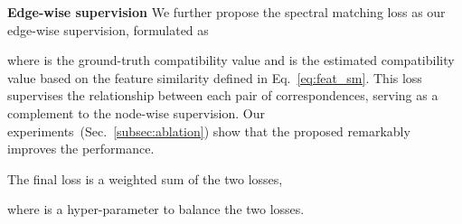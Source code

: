 \noindent\textbf{Edge-wise supervision} 
We further propose the spectral matching loss as our edge-wise supervision, formulated as
 
where  is the ground-truth compatibility value and  is the estimated compatibility value based on the feature similarity defined in Eq.~\ref{eq:feat_sm}.
This loss supervises the relationship between each pair of correspondences, serving as a complement to the node-wise supervision. Our experiments~(Sec.~\ref{subsec:ablation}) show that the proposed  remarkably improves the performance.




The final loss is a weighted sum of the two losses,

where  is a hyper-parameter to balance the two losses.


